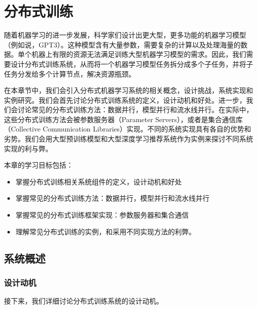 \documentclass[letterpaper,10pt,english]{sphinxmanual}
\begin{document}
\chapter{分布式训练}
\label{\detokenize{chapter_distributed_training/index:id1}}\label{\detokenize{chapter_distributed_training/index::doc}}
\sphinxAtStartPar
随着机器学习的进一步发展，科学家们设计出更大型，更多功能的机器学习模型（例如说，GPT\sphinxhyphen{}3）。这种模型含有大量参数，需要复杂的计算以及处理海量的数据。单个机器上有限的资源无法满足训练大型机器学习模型的需求。因此，我们需要设计分布式训练系统，从而将一个机器学习模型任务拆分成多个子任务，并将子任务分发给多个计算节点，解决资源瓶颈。

\sphinxAtStartPar
在本章节中，我们会引入分布式机器学习系统的相关概念，设计挑战，系统实现和实例研究。我们会首先讨论分布式训练系统的定义，设计动机和好处。进一步，我们会讨论常见的分布式训练方法：数据并行，模型并行和流水线并行。在实际中，这些分布式训练方法会被参数服务器（Parameter
Servers），或者是集合通信库（Collective Communication
Libraries）实现。不同的系统实现具有各自的优势和劣势。我们会用大型预训练模型和大型深度学习推荐系统作为实例来探讨不同系统实现的利与弊。

\sphinxAtStartPar
本章的学习目标包括：
\begin{itemize}
\item {} 
\sphinxAtStartPar
掌握分布式训练相关系统组件的定义，设计动机和好处

\item {} 
\sphinxAtStartPar
掌握常见的分布式训练方法：数据并行，模型并行和流水线并行

\item {} 
\sphinxAtStartPar
掌握常见的分布式训练框架实现：参数服务器和集合通信

\item {} 
\sphinxAtStartPar
理解常见分布式训练的实例，和采用不同实现方法的利弊。

\end{itemize}


\section{系统概述}
\label{\detokenize{chapter_distributed_training/overview:id1}}\label{\detokenize{chapter_distributed_training/overview::doc}}

\subsection{设计动机}
\label{\detokenize{chapter_distributed_training/overview:id2}}
\sphinxAtStartPar
接下来，我们详细讨论分布式训练系统的设计动机。
\end{document}
